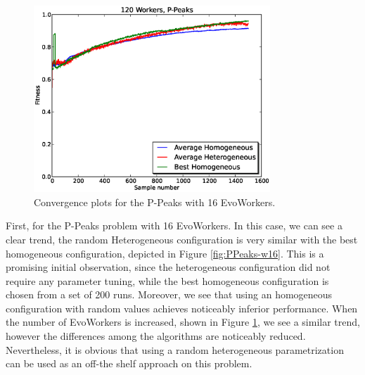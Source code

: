 \documentclass{sig-alternate}
\begin{document}
\begin{figure}[t]
\centering
\includegraphics[width=3.5in]{eps/PPeaks-w120.eps}
\caption{Convergence plots for the P-Peaks with 16 EvoWorkers.}
\label{fig:PPeaks-w120}
\end{figure}


First, for the P-Peaks problem with 16 EvoWorkers.
In this case, we can see a clear trend, the random Heterogeneous configuration is very similar with the best homogeneous configuration,
depicted in Figure \ref{fig:PPeaks-w16}.
This is a promising initial observation, since the heterogeneous configuration did not require any parameter tuning, while the best homogeneous configuration
is chosen from a set of 200 runs.
Moreover, we see that using an homogeneous configuration with random values achieves noticeably inferior performance.
When the number of EvoWorkers is increased, shown in Figure \ref{fig:PPeaks-w120}, we see a similar trend,
however the differences among the algorithms are noticeably reduced.
Nevertheless, it is obvious that using a random heterogeneous parametrization can be used as an off-the shelf approach on this problem.
\end{document}

